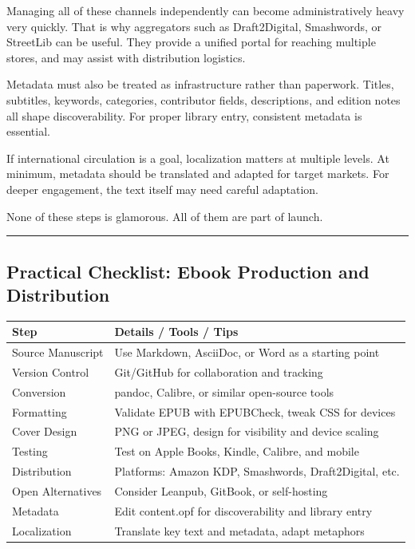 Managing all of these channels independently can become administratively
heavy very quickly. That is why aggregators such as Draft2Digital,
Smashwords, or StreetLib can be useful. They provide a unified portal
for reaching multiple stores, and may assist with distribution
logistics.

Metadata must also be treated as infrastructure rather than paperwork.
Titles, subtitles, keywords, categories, contributor fields,
descriptions, and edition notes all shape discoverability. For proper
library entry, consistent metadata is essential.

If international circulation is a goal, localization matters at multiple
levels. At minimum, metadata should be translated and adapted for target
markets. For deeper engagement, the text itself may need careful
adaptation.

None of these steps is glamorous. All of them are part of launch.

\begin{center}\rule{0.5\linewidth}{0.5pt}\end{center}

\hypertarget{practical-checklist-ebook-production-and-distribution}{%
\subsection{Practical Checklist: Ebook Production and
Distribution}\label{practical-checklist-ebook-production-and-distribution}}

\begin{longtable}[]{@{}ll@{}}
\toprule
Step & Details / Tools / Tips\tabularnewline
\midrule
\endhead
Source Manuscript & Use Markdown, AsciiDoc, or Word as a starting
point\tabularnewline
Version Control & Git/GitHub for collaboration and
tracking\tabularnewline
Conversion & pandoc, Calibre, or similar open-source
tools\tabularnewline
Formatting & Validate EPUB with EPUBCheck, tweak CSS for
devices\tabularnewline
Cover Design & PNG or JPEG, design for visibility and device
scaling\tabularnewline
Testing & Test on Apple Books, Kindle, Calibre, and
mobile\tabularnewline
Distribution & Platforms: Amazon KDP, Smashwords, Draft2Digital,
etc.\tabularnewline
Open Alternatives & Consider Leanpub, GitBook, or
self-hosting\tabularnewline
Metadata & Edit content.opf for discoverability and library
entry\tabularnewline
Localization & Translate key text and metadata, adapt
metaphors\tabularnewline
\bottomrule
\end{longtable}

